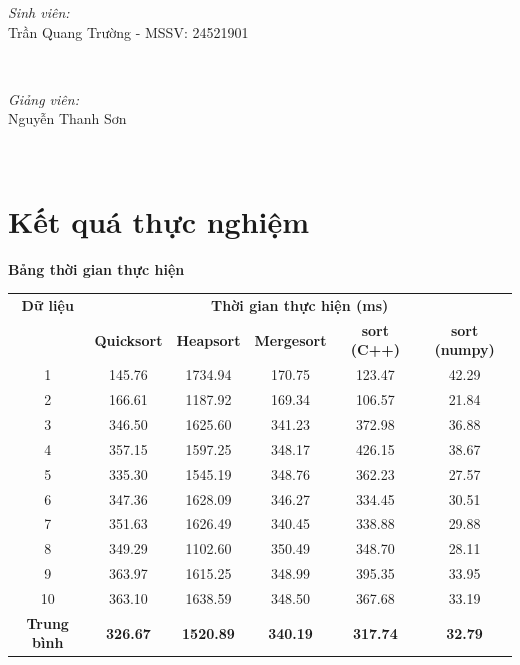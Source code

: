 \documentclass[12pt]{article}
\begin{document}
\begin{titlepage}
\begin{minipage}{0.4\textwidth}
\begin{flushleft} \large
\emph{Sinh viên:}\\
Trần Quang Trường - MSSV: 24521901
\end{flushleft}
\end{minipage}
~
\begin{minipage}{0.4\textwidth}
\begin{flushright} \large
\emph{Giảng viên:} \\
Nguyễn Thanh Sơn
\end{flushright}
\end{minipage}\\[2cm]





\vfill 

\end{titlepage}


\section{Kết quá thực nghiệm}
\textbf{Bảng thời gian thực hiện}
\begin{table}[h]
    \centering
    \begin{tabular}{|c|c|c|c|c|c|}
        \hline
        \textbf{Dữ liệu} & \multicolumn{5}{c|}{\textbf{Thời gian thực hiện (ms)}} \\ 
        \cline{2-6}
         & \textbf{Quicksort} & \textbf{Heapsort} & \textbf{Mergesort} & \textbf{sort (C++)} & \textbf{sort (numpy)} \\
        \hline
        1  & 145.76 & 1734.94 & 170.75 & 123.47 & 42.29 \\ 
        \hline
        2  & 166.61 & 1187.92 & 169.34 & 106.57 & 21.84 \\ 
        \hline
        3  & 346.50 & 1625.60 & 341.23 & 372.98 & 36.88 \\ 
        \hline
        4  & 357.15 & 1597.25 & 348.17 & 426.15 & 38.67 \\ 
        \hline
        5  & 335.30 & 1545.19 & 348.76 & 362.23 & 27.57 \\ 
        \hline
        6  & 347.36 & 1628.09 & 346.27 & 334.45 & 30.51 \\ 
        \hline
        7  & 351.63 & 1626.49 & 340.45 & 338.88 & 29.88 \\ 
        \hline
        8  & 349.29 & 1102.60 & 350.49 & 348.70 & 28.11 \\ 
        \hline
        9  & 363.97 & 1615.25 & 348.99 & 395.35 & 33.95 \\ 
        \hline
        10 & 363.10 & 1638.59 & 348.50 & 367.68 & 33.19 \\ 
        \hline
        \textbf{Trung bình} & \textbf{326.67} & \textbf{1520.89} & \textbf{340.19} & \textbf{317.74} & \textbf{32.79} \\ 
        \hline
    \end{tabular}
\end{table}
\end{document}
